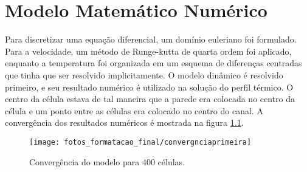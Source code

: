 \chapter{Modelo Matemático Numérico}


Para discretizar uma equação diferencial, um domínio euleriano foi formulado. Para a velocidade, um método de Runge-kutta de quarta ordem foi aplicado, enquanto a temperatura foi organizada em um esquema de diferenças centradas que tinha que ser resolvido implicitamente. O modelo dinâmico é resolvido primeiro, e seu resultado numérico é utilizado na solução do perfil térmico. O centro da célula estava de tal maneira que a parede era colocada no centro da célula e um ponto entre as células era colocado no centro do canal. A convergência dos resultados numéricos é mostrada na figura \ref{sistema}.

\begin{figure}[!h]
	\centering
	\texttt{[image: fotos\_formatacao\_final/convergnciaprimeira]}
	\caption{Convergência do modelo para 400 células.}
	\label{sistema}
\end{figure}